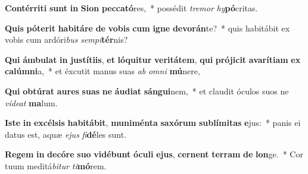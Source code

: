 \item \textbf{Con}\textbf{tér}\textbf{ri}\textbf{ti} \textbf{sunt} \textbf{in} \textbf{Si}\textbf{on} \textbf{pec}\textbf{ca}\textbf{tó}res,~* possédit \textit{tre}\textit{mor} \textit{hy}\textbf{pó}critas.
\item \textbf{Quis} \textbf{pót}\textbf{e}\textbf{rit} \textbf{ha}\textbf{bi}\textbf{tá}\textbf{re} \textbf{de} \textbf{vo}\textbf{bis} \textbf{cum} \textbf{i}\textbf{gne} \textbf{de}\textbf{vo}\textbf{rán}te?~* quis habitábit ex vobis cum ardóri\textit{bus} \textit{sem}\textit{pi}\textbf{tér}nis?
\item \textbf{Qui} \textbf{ám}\textbf{bu}\textbf{lat} \textbf{in} \textbf{jus}\textbf{tí}\textbf{ti}\textbf{is}, \textbf{et} \textbf{ló}\textbf{qui}\textbf{tur} \textbf{ve}\textbf{ri}\textbf{tá}\textbf{tem}, \textbf{qui} \textbf{pró}\textbf{ji}\textbf{cit} \textbf{a}\textbf{va}\textbf{rí}\textbf{ti}\textbf{am} \textbf{ex} \textbf{ca}\textbf{lúm}\textbf{ni}a,~* et éxcutit manus suas \textit{ab} \textit{om}\textit{ni} \textbf{mú}nere,
\item \textbf{Qui} \textbf{ob}\textbf{tú}\textbf{rat} \textbf{au}\textbf{res} \textbf{su}\textbf{as} \textbf{ne} \textbf{áu}\textbf{di}\textbf{at} \textbf{sán}\textbf{gui}nem,~* et claudit óculos suos ne \textit{ví}\textit{de}\textit{at} \textbf{ma}lum.
\item \textbf{Is}\textbf{te} \textbf{in} \textbf{ex}\textbf{cél}\textbf{sis} \textbf{ha}\textbf{bi}\textbf{tá}\textbf{bit}, \textbf{mu}\textbf{ni}\textbf{mén}\textbf{ta} \textbf{sa}\textbf{xó}\textbf{rum} \textbf{sub}\textbf{lí}\textbf{mi}\textbf{tas} \textbf{e}jus:~* panis ei datus est, aquæ \textit{e}\textit{jus} \textit{fi}\textbf{dé}les sunt.
\item \textbf{Re}\textbf{gem} \textbf{in} \textbf{de}\textbf{có}\textbf{re} \textbf{su}\textbf{o} \textbf{vi}\textbf{dé}\textbf{bunt} \textbf{ó}\textbf{cu}\textbf{li} \textbf{e}\textbf{jus}, \textbf{cer}\textbf{nent} \textbf{ter}\textbf{ram} \textbf{de} \textbf{lon}ge.~* Cor tuum meditá\textit{bi}\textit{tur} \textit{ti}\textbf{mó}rem.

